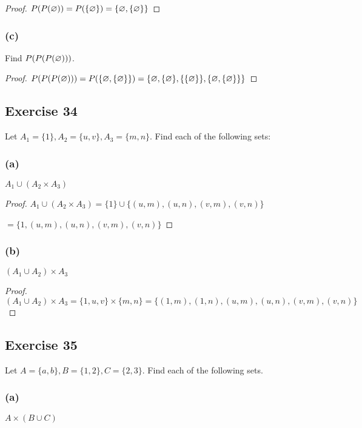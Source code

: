 \documentclass[14pt]{extarticle}
\let\mathscr\relax
\newcommand{\ps}{\mathscr{P}}
\newcommand{\es}{\varnothing}
\begin{document}
\begin{proof}
  \(\ps(\ps(\es)) = \ps(\{\es\}) = \{\es, \{\es\}\}\)
\end{proof}

\subsubsection{(c)}
Find \(\ps(\ps(\ps(\es)))\).

\begin{proof}
  \(\ps(\ps(\ps(\es))) = \ps(\{\es, \{\es\}\}) = \{\es, \{\es\}, \{\{\es\}\}, \{\es, \{\es\}\}\}\)
\end{proof}

\subsection{Exercise 34}
Let \(A_1 = \{1\}, A_2 = \{u, v\}, A_3 = \{m, n\}\). Find each of the following sets:

\subsubsection{(a)}
$A_1 \cup (A_2 \times A_3)$

\begin{proof}
  \(A_1 \cup (A_2 \times A_3) = \{1\} \cup \{(u, m), (u, n), (v, m), (v, n)\}\)

  \(= \{1, (u, m), (u, n), (v, m), (v, n)\}\)
\end{proof}

\subsubsection{(b)}
$(A_1 \cup A_2) \times A_3$

\begin{proof}
  \((A_1 \cup A_2) \times A_3 = \{1, u, v\} \times \{m, n\} = \{(1, m), (1, n), (u, m), (u, n), (v, m), (v, n)\}\)
\end{proof}

\subsection{Exercise 35}
Let \(A = \{a, b\}, B = \{1, 2\}, C = \{2, 3\}\). Find each of the following sets.

\subsubsection{(a)}
$A \times (B \cup C)$
\end{document}
